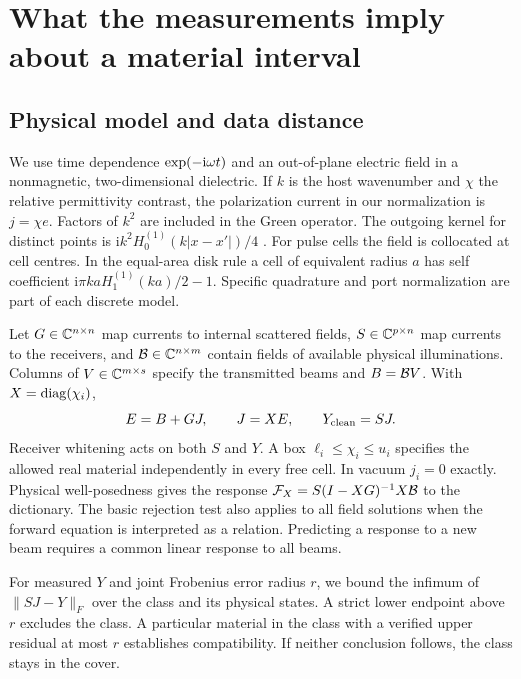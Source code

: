 \section{What the measurements imply about a material interval}\label{sec:material}
\subsection{Physical model and data distance}
We use time dependence $\exp(-{\rm i}\omega t)$ and an out-of-plane electric field in a nonmagnetic, two-dimensional dielectric. If $k$ is the host wavenumber and $\chi$ the relative permittivity contrast, the polarization current in our normalization is $j=\chi e$. Factors of $k^2$ are included in the Green operator. The outgoing kernel for distinct points is $\mathrm{i}k^2 H_0^{(1)}(k|x-x'|)/4$ \cite{colton,richmond}. For pulse cells the field is collocated at cell centres. In the equal-area disk rule a cell of equivalent radius $a$ has self coefficient $\mathrm{i}\pi ka H_1^{(1)}(ka)/2-1$. Specific quadrature and port normalization are part of each discrete model.

Let $G\in\mathbb C^{n\times n}$ map currents to internal scattered fields, $S\in\mathbb C^{p\times n}$ map currents to the receivers, and $\mathcal B\in\mathbb C^{n\times m}$ contain fields of available physical illuminations. Columns of $V\in\mathbb C^{m\times s}$ specify the transmitted beams and $B=\mathcal B V$. With $X=\operatorname{diag}(\chi_i)$,
\begin{equation}
 E=B+GJ,\qquad J=XE,\qquad Y_{\rm clean}=SJ .
 \label{eq:physics}
\end{equation}
Receiver whitening acts on both $S$ and $Y$. A box $\ell_i\leq\chi_i\leq u_i$ specifies the allowed real material independently in every free cell. In vacuum $j_i=0$ exactly. Physical well-posedness gives the response $\mathcal F_X=S(I-XG)^{-1}X\mathcal B$ to the dictionary. The basic rejection test also applies to all field solutions when the forward equation is interpreted as a relation. Predicting a response to a new beam requires a common linear response to all beams.

For measured $Y$ and joint Frobenius error radius $r$, we bound the infimum of $\|SJ-Y\|_F$ over the class and its physical states. A strict lower endpoint above $r$ excludes the class. A particular material in the class with a verified upper residual at most $r$ establishes compatibility. If neither conclusion follows, the class stays in the cover.

